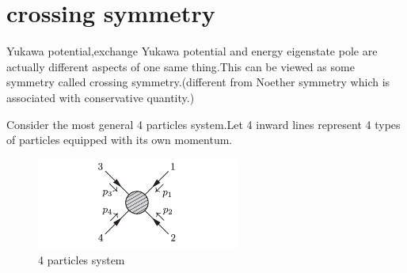 \documentclass[a4paper]{article}
\begin{document}
\section{crossing symmetry}
Yukawa potential,exchange Yukawa potential and energy eigenstate pole are actually different aspects of one same thing.This can be viewed as some symmetry called crossing symmetry.(different from Noether symmetry which is associated with conservative quantity.)
\par Consider the most general 4 particles system.Let 4 inward lines represent 4 types of particles equipped with its own momentum.
\begin{figure}[htbp]
	\centering
	\includegraphics[width=0.6\textwidth]{11.png}
	\caption{4 particles system}
\end{figure}
\end{document}
